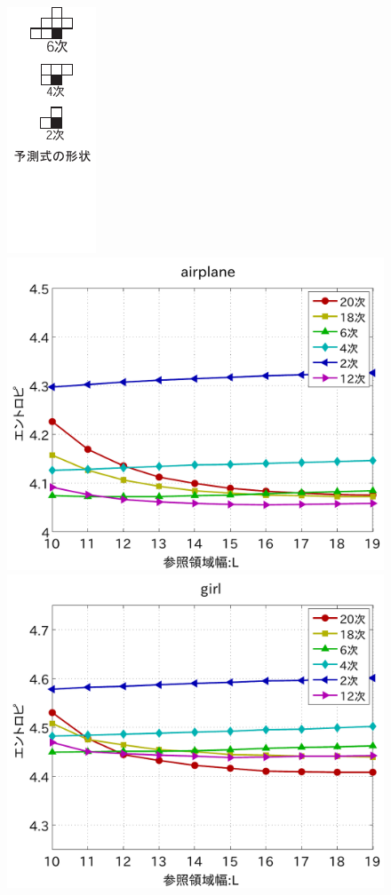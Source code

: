 \documentclass[25pt, landscape,dvipdfmx]{foils}
\begin{document}
\begin{figure}[b]
\begin{center}
\vspace{3mm}
\includegraphics[scale=2]{fig/yosokusiki2.pdf}
\includegraphics[width=11.5cm]{fig/test1/airplane.pdf}
\includegraphics[width=11.5cm]{fig/test1/girl.pdf}
\end{center}
\end{figure}
\end{document}
